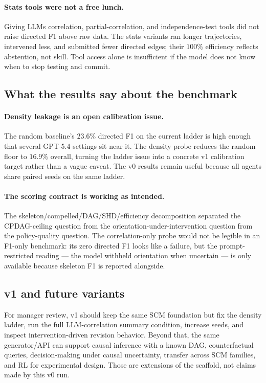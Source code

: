 \paragraph{Stats tools were not a free lunch.} Giving LLMs correlation, partial-correlation, and independence-test tools did not raise directed F1 above raw data. The stats variants ran longer trajectories, intervened less, and submitted fewer directed edges; their $100\%$ efficiency reflects abstention, not skill. Tool access alone is insufficient if the model does not know when to stop testing and commit.

\subsection{What the results say about the benchmark}

\paragraph{Density leakage is an open calibration issue.} The random baseline's $23.6\%$ directed F1 on the current ladder is high enough that several GPT-5.4 settings sit near it. The density probe reduces the random floor to $16.9\%$ overall, turning the ladder issue into a concrete v1 calibration target rather than a vague caveat. The v0 results remain useful because all agents share paired seeds on the same ladder.

\paragraph{The scoring contract is working as intended.} The skeleton/compelled/DAG/SHD/efficiency decomposition separated the CPDAG-ceiling question from the orientation-under-intervention question from the policy-quality question. The correlation-only probe would not be legible in an F1-only benchmark: its zero directed F1 looks like a failure, but the prompt-restricted reading --- the model withheld orientation when uncertain --- is only available because skeleton F1 is reported alongside.

\subsection{v1 and future variants}
\label{sec:future-scm-ladder}

For manager review, v1 should keep the same SCM foundation but fix the density ladder, run the full LLM-correlation summary condition, increase seeds, and inspect intervention-driven revision behavior. Beyond that, the same generator/API can support causal inference with a known DAG, counterfactual queries, decision-making under causal uncertainty, transfer across SCM families, and RL for experimental design. Those are extensions of the scaffold, not claims made by this v0 run.

